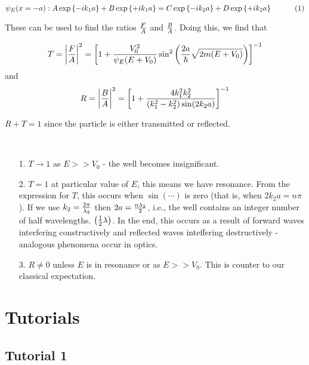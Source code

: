 \documentclass[english, 11pt]{article}
\begin{document}
        \[ \psi_E(x=-a) : A\expo{-ik_1a} + B\expo{+ik_1a} = C\expo{-ik_2a}+D\expo{+ik_2a} \ \ \  \ \ \ \ \ \ (1) \]

        These can be used to find the ratios $\frac{F}{A}$ and $\frac{B}{A}$. Doing this, we find that

        \[ T = \left|\frac{F}{A}\right|^2 = \left[ 1 + \frac{V_0^2}{\psi_E(E+V_0)}\sin^2 \left( \frac{2a}{\hbar} \sqrt{2m(E+V_0)} \right) \right]^{-1} \]
        and
        \[ R = \left|\frac{B}{A}\right|^2 = \left[ 1 + \frac{4k_1^2k_2^2}{(k_1^2-k_2^2)\sin(2k_2a)} \right]^{-1} \]

        $R + T = 1$ since the particle is either transmitted or reflected.

        \begin{note} \
          \begin{itemize}
            \item[1.] $T \longrightarrow 1$ as $E >> V_0$ - the well becomes insignificant.
            \item[2.] $T = 1$ at particular value of $E$, this means we have resonance. From the expression for $T$, this occurs when $\sin (\cdots)$ is zero (that is, when $2k_2a = n \pi$). If we use $k_2 = \frac{2\pi}{\lambda_2}$ then $2a=\frac{n\lambda_2}{2}$, i.e., the well contains an integer number of half wavelengths. $\left(\frac{1}{2}\lambda\right)$. In the end, this occurs as a result of forward waves interfering constructively and reflected waves inteffering destructively - analogous phenomena occur in optics.
            \item[3.] $R \not = 0$ unless $E$ is in resonance or as $E >> V_0$. This is counter to our classical expectation.
          \end{itemize}
        \end{note}


   \section{Tutorials}

     \subsection{Tutorial 1}
\end{document}
